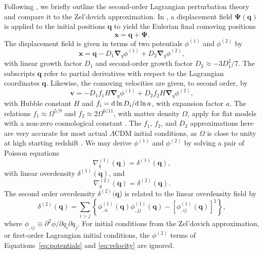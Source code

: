 Following \citet{2010MNRAS.403.1859J}, we briefly outline the second-order Lagrangian perturbation theory and compare it to the Zel'dovich approximation.  In \lpt, a displacement field $\boldsymbol{\Psi}(\boldsymbol{q})$ is applied to the initial positions $\boldsymbol{q}$ to yield the Eulerian final comoving positions
\begin{equation} \label{eq:displacement}
	\boldsymbol{x} = \boldsymbol{q} + \boldsymbol{\Psi}.
\end{equation}
The displacement field is given in terms of two potentials $\phi^{(1)}$ and $\phi^{(2)}$ by
\begin{equation} \label{eq:potentials}
	\boldsymbol{x} = \boldsymbol{q} - D_{1} \boldsymbol{\nabla}_{q} \phi^{(1)} + D_{2} \boldsymbol{\nabla}_{q} \phi^{(2)},
\end{equation}
with linear growth factor $D_{1}$ and second-order growth factor $D_{2} \approx -3 D_{1}^{2} / 7$.  The subscripts $\boldsymbol{q}$ refer to partial derivatives with respect to the Lagrangian coordinates $\boldsymbol{q}$.  Likewise, the comoving velocities are given, to second order, by
\begin{equation} \label{eq:velocity}
	\boldsymbol{v} =  - D_{1} f_{1} H \boldsymbol{\nabla}_{q} \phi^{(1)} + D_{2} f_{2} H \boldsymbol{\nabla}_{q} \phi^{(2)},
\end{equation}
with Hubble constant $H$ and $f_{i} = {\rm {d}}\, \mathrm{ln}\, D_{i} / {\rm {d}}\, \mathrm{ln}\, a$, with expansion factor $a$.  The relations $f_{1} \approx \Omega^{5/9}$ and $f_{2} \approx 2 \Omega^{6/11}$, with matter density $\Omega$, apply for flat models with a non-zero cosmological constant \citep{1995A&A...296..575B}.  The $f_{1}$, $f_{2}$, and $D_{2}$ approximations here are very accurate for most actual $\Lambda$CDM initial conditions, as $\Omega$ is close to unity at high starting redshift \citep{2010MNRAS.403.1859J}.  We may derive $\phi^{(1)}$ and $\phi^{(2)}$ by solving a pair of Poisson equations
\begin{equation} \label{eq:poisson1}
	\nabla_{q}^{(1)}(\boldsymbol{q}) = \delta^{(1)}(\boldsymbol{q}),
\end{equation}
with linear overdensity $\delta^{(1)}(\boldsymbol{q})$, and
\begin{equation} \label{eq:poisson2}
	\nabla_{q}^{(2)}(\boldsymbol{q}) = \delta^{(2)}(\boldsymbol{q}).
\end{equation}
The second order overdensity $\delta^{(2)}(\boldsymbol{q}$) is related to the linear overdensity field by
\begin{equation} \label{eq:second-order_overdensity}
	\delta^{(2)}(\boldsymbol{q}) = \sum_{i > j} \left\{ \phi_{,ii}^{(1)}(\boldsymbol{q}) \phi_{,jj}^{(1)}(\boldsymbol{q}) - \left[ \phi_{,ij}^{(1)}(\boldsymbol{q}) \right]^{2} \right\},
\end{equation}
where $\phi_{,ij} \equiv \partial^{2} \phi / \partial q_{i} \partial q_{j}$.  For initial conditions from the Zel'dovich approximation, or first-order Lagrangian initial conditions, the $\phi^{(2)}$ terms of Equations~\ref{eq:potentials} and \ref{eq:velocity} are ignored.




